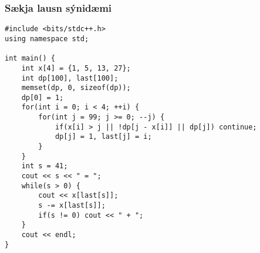 \documentclass{beamer}
\begin{document}
\begin{frame}[fragile]
\frametitle{Sækja lausn sýnidæmi}

\begin{scriptsize}
\begin{verbatim}
#include <bits/stdc++.h>
using namespace std;

int main() {
    int x[4] = {1, 5, 13, 27};
    int dp[100], last[100];
    memset(dp, 0, sizeof(dp));
    dp[0] = 1;
    for(int i = 0; i < 4; ++i) {
        for(int j = 99; j >= 0; --j) {
            if(x[i] > j || !dp[j - x[i]] || dp[j]) continue;
            dp[j] = 1, last[j] = i;
        }
    }
    int s = 41;
    cout << s << " = ";
    while(s > 0) {
        cout << x[last[s]];
        s -= x[last[s]];
        if(s != 0) cout << " + ";
    }
    cout << endl;
}
\end{verbatim}
\end{scriptsize}

\end{frame}
\end{document}
